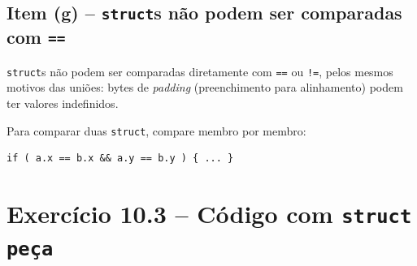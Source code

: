 \documentclass[12pt,a4paper]{article}
\begin{document}
\subsection*{Item (g) -- \texttt{struct}s não podem ser comparadas com \texttt{==}}
\begin{tcolorbox}[colback=green!5,colframe=deitelgreen,title={\bfseries VERDADEIRO}]
\texttt{struct}s não podem ser comparadas diretamente com \texttt{==} ou
\texttt{!=}, pelos mesmos motivos das uniões: bytes de \textit{padding} (preenchimento
para alinhamento) podem ter valores indefinidos.

Para comparar duas \texttt{struct}, compare membro por membro:
\begin{lstlisting}
if ( a.x == b.x && a.y == b.y ) { ... }
\end{lstlisting}
\end{tcolorbox}

\newpage

\section{Exercício 10.3 -- Código com \texttt{struct peça}}
\end{document}
